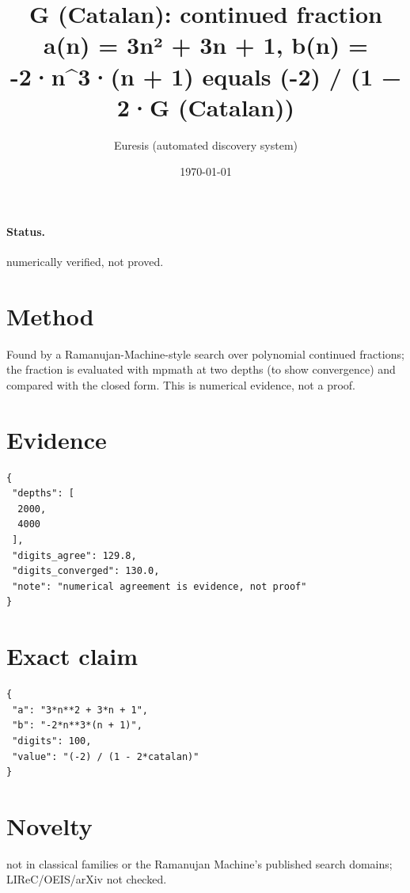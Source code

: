 \documentclass[11pt]{article}
\title{G (Catalan): continued fraction a(n) = 3n² + 3n + 1, b(n) = -2·n\^{}3·(n + 1) equals (-2) / (1 − 2·G (Catalan))}
\author{Euresis (automated discovery system)}
\date{\today}
\begin{document}
\maketitle
\paragraph{Status.} numerically verified, not proved.
\section{Method}
Found by a Ramanujan-Machine-style search over polynomial continued fractions; the fraction is evaluated with mpmath at two depths (to show convergence) and compared with the closed form. This is numerical evidence, not a proof.
\section{Evidence}
\begin{verbatim}
{
 "depths": [
  2000,
  4000
 ],
 "digits_agree": 129.8,
 "digits_converged": 130.0,
 "note": "numerical agreement is evidence, not proof"
}
\end{verbatim}
\section{Exact claim}
\begin{verbatim}
{
 "a": "3*n**2 + 3*n + 1",
 "b": "-2*n**3*(n + 1)",
 "digits": 100,
 "value": "(-2) / (1 - 2*catalan)"
}
\end{verbatim}
\section{Novelty}
not in classical families or the Ramanujan Machine's published search domains; LIReC/OEIS/arXiv not checked.
\end{document}
